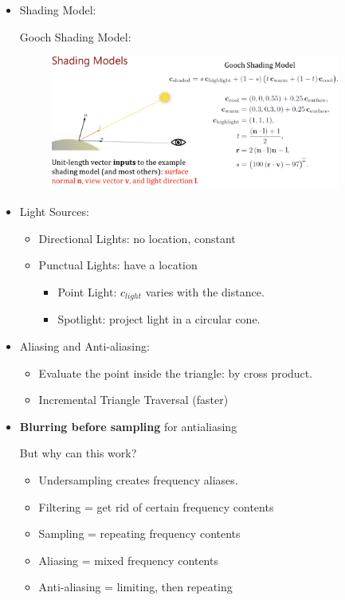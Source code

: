 \documentclass{article}
\begin{document}
\begin{itemize}
    \item Shading Model:
    
Gooch Shading Model:
\begin{figure}[H]
        \centering
        \includegraphics[width=0.9\textwidth]{imgs/gooch_shading.jpeg}
        
    \end{figure}

\item Light Sources:
\begin{itemize}
    \item Directional Lights: no location, constant
    
    \item Punctual Lights: have a location
    \begin{itemize}
        \item Point Light: $c_{light}$ varies with the distance.
        \item Spotlight: project light in a circular cone.
    \end{itemize}
\end{itemize}

\item Aliasing and Anti-aliasing:
\begin{itemize}
    \item Evaluate the point inside the triangle: by cross product.
    \item Incremental Triangle Traversal (faster)
\end{itemize}

\item \textbf{Blurring before sampling} for antialiasing

But why can this work?

\begin{itemize}
    \item Undersampling creates frequency aliases.
    \item Filtering = get rid of certain frequency contents
    \item Sampling = repeating frequency contents
    \item Aliasing = mixed frequency contents
    \item Anti-aliasing = limiting, then repeating
    

\end{itemize}
\end{itemize}
\end{document}

